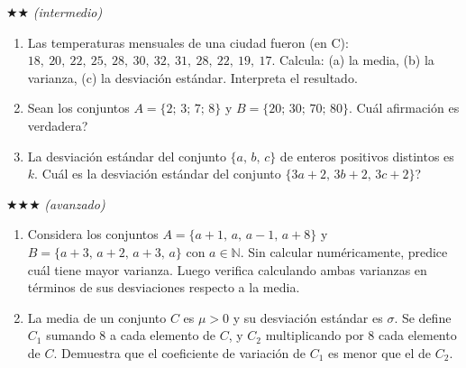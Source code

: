 \documentclass[11pt, letterpaper]{article}
\begin{document}
$\bigstar\bigstar$ \textit{(intermedio)}

\begin{enumerate}[label=\textbf{\arabic*.}, leftmargin=*, resume]
  \item Las temperaturas mensuales de una ciudad fueron (en \textdegree C): $18,\ 20,\ 22,\ 25,\ 28,\ 30,\ 32,\ 31,\ 28,\ 22,\ 19,\ 17$. Calcula: (a) la media, (b) la varianza, (c) la desviaci\'on est\'andar. Interpreta el resultado.

  \item Sean los conjuntos $A = \{2;\, 3;\, 7;\, 8\}$ y $B = \{20;\, 30;\, 70;\, 80\}$. \textquestiondown Cu\'al afirmaci\'on es verdadera?
  \begin{minipage}[t]{\linewidth}
  \begin{minipage}{\linewidth}\vspace{4mm}
  \end{minipage}\vspace{4mm}
  \end{minipage}

  \item La desviaci\'on est\'andar del conjunto $\{a,\, b,\, c\}$ de enteros positivos distintos es $k$. \textquestiondown Cu\'al es la desviaci\'on est\'andar del conjunto $\{3a+2,\, 3b+2,\, 3c+2\}$?
\end{enumerate}

$\bigstar\bigstar\bigstar$ \textit{(avanzado)}

\begin{enumerate}[label=\textbf{\arabic*.}, leftmargin=*, resume]
  \item Considera los conjuntos $A = \{a+1,\, a,\, a-1,\, a+8\}$ y $B = \{a+3,\, a+2,\, a+3,\, a\}$ con $a \in \mathbb{N}$. Sin calcular num\'ericamente, predice cu\'al tiene mayor varianza. Luego verifica calculando ambas varianzas en t\'erminos de sus desviaciones respecto a la media.
  \vspace{3.5cm}

  \item La media de un conjunto $C$ es $\mu > 0$ y su desviaci\'on est\'andar es $\sigma$. Se define $C_1$ sumando 8 a cada elemento de $C$, y $C_2$ multiplicando por 8 cada elemento de $C$. Demuestra que el coeficiente de variaci\'on de $C_1$ es menor que el de $C_2$.
  \vspace{3.5cm}
\end{enumerate}
\end{document}
